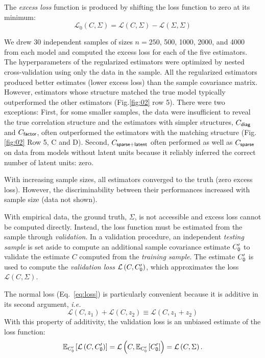 \documentclass[10pt]{article}
\newcommand{\figref}[2]{Fig.\;\ref{fig:#1}\,#2}
\newcommand{\loss}[1]{\mathcal L\left(#1\right)}
\newcommand{\eloss}[1]{\mathcal L_0\left(#1\right)}
\newcommand{\E}[2][]{\mathbb E_{#1}\left[ #2\right]}    %
\newcommand{\ie}{\emph{i.e.}\;}
\begin{document}
The \emph{excess loss} function is produced by shifting the loss function to zero at its minimum:
\begin{equation}\label{eq:excess-loss}
    \eloss{C,\Sigma} = \loss{C,\Sigma}-\loss{\Sigma,\Sigma}
\end{equation}

We drew 30 independent samples of sizes $n=250$, 500, 1000, 2000, and 4000 from each model and computed the excess loss for each of the five estimators.  The hyperparameters of the regularized estimators were optimized by nested cross-validation using only the data in the sample.  All the regularized estimators produced better estimates (lower excess loss) than the sample covariance matrix.  However, estimators whose structure matched the true model typically outperformed the other estimators (\figref{02}{\,row 5}).  There were two exceptions: First, for some smaller samples, the data were insufficient to reveal the true correlation structure and the estimators with simpler structures, $C_{\sf diag}$ and $C_{\sf factor}$, often outperformed the estimators with the matching structure (\figref{02}{\,Row 5, C and D}).  Second, $C_{\sf sparse+latent}$ often performed as well as $C_{\sf sparse}$ on data from models without latent units because it reliably inferred the correct number of latent units: zero.  

With increasing sample sizes, all estimators converged to the truth (zero excess loss).  However, 
the discriminability between their performances increased with sample size (data not shown).

With empirical data, the ground truth, $\Sigma$, is not accessible and excess loss cannot be computed directly. Instead, the loss function must be estimated from the sample through \emph{validation}.  In a validation procedure, an independent \emph{testing sample} is set aside to compute an additional sample covariance estimate $C_{\sf 0}^\prime$ to validate the estimate $C$ computed from the  \emph{training sample}.   The estimate $C_{\sf 0}^\prime$ is used to 
compute the \emph{validation loss} $\loss{C,C_{\sf 0}^\prime}$, which approximates the loss  $\loss{C,\Sigma}$.

The normal loss (Eq.~\ref{eq:loss}) is particularly convenient because it is additive in its second argument, \ie
 \begin{equation*}\label{eq:additivity}
 \loss{C,z_1} + \loss{C,z_2} \equiv \loss{C,z_1+z_2}
 \end{equation*}
With this property of additivity, the validation loss is an unbiased estimate of the loss function:
\begin{equation*}
    \E[C_{\sf 0}^\prime]{\loss{C,C_{\sf 0}^\prime}}=\loss{C,\E[C_{\sf 0}^\prime]{C_{\sf 0}^\prime}}=\loss{C,\Sigma}.
\end{equation*}
\end{document}
